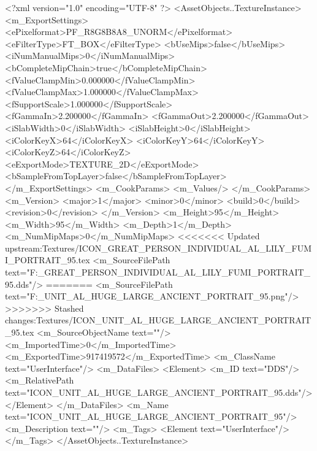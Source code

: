 <?xml version="1.0" encoding="UTF-8" ?>
<AssetObjects..TextureInstance>
	<m_ExportSettings>
		<ePixelformat>PF_R8G8B8A8_UNORM</ePixelformat>
		<eFilterType>FT_BOX</eFilterType>
		<bUseMips>false</bUseMips>
		<iNumManualMips>0</iNumManualMips>
		<bCompleteMipChain>true</bCompleteMipChain>
		<fValueClampMin>0.000000</fValueClampMin>
		<fValueClampMax>1.000000</fValueClampMax>
		<fSupportScale>1.000000</fSupportScale>
		<fGammaIn>2.200000</fGammaIn>
		<fGammaOut>2.200000</fGammaOut>
		<iSlabWidth>0</iSlabWidth>
		<iSlabHeight>0</iSlabHeight>
		<iColorKeyX>64</iColorKeyX>
		<iColorKeyY>64</iColorKeyY>
		<iColorKeyZ>64</iColorKeyZ>
		<eExportMode>TEXTURE_2D</eExportMode>
		<bSampleFromTopLayer>false</bSampleFromTopLayer>
	</m_ExportSettings>
	<m_CookParams>
		<m_Values/>
	</m_CookParams>
	<m_Version>
		<major>1</major>
		<minor>0</minor>
		<build>0</build>
		<revision>0</revision>
	</m_Version>
	<m_Height>95</m_Height>
	<m_Width>95</m_Width>
	<m_Depth>1</m_Depth>
	<m_NumMipMaps>0</m_NumMipMaps>
<<<<<<< Updated upstream:Textures/ICON_GREAT_PERSON_INDIVIDUAL_AL_LILY_FUMI_PORTRAIT_95.tex
	<m_SourceFilePath text="F:\DT\lilyimages\gpportrait\ICON_GREAT_PERSON_INDIVIDUAL_AL_LILY_FUMI_PORTRAIT_95.dds"/>
=======
	<m_SourceFilePath text="F:\DT\lilyimages\all\ICON_UNIT_AL_HUGE_LARGE_ANCIENT_PORTRAIT_95.png"/>
>>>>>>> Stashed changes:Textures/ICON_UNIT_AL_HUGE_LARGE_ANCIENT_PORTRAIT_95.tex
	<m_SourceObjectName text=""/>
	<m_ImportedTime>0</m_ImportedTime>
	<m_ExportedTime>917419572</m_ExportedTime>
	<m_ClassName text="UserInterface"/>
	<m_DataFiles>
		<Element>
			<m_ID text="DDS"/>
			<m_RelativePath text="ICON_UNIT_AL_HUGE_LARGE_ANCIENT_PORTRAIT_95.dds"/>
		</Element>
	</m_DataFiles>
	<m_Name text="ICON_UNIT_AL_HUGE_LARGE_ANCIENT_PORTRAIT_95"/>
	<m_Description text=""/>
	<m_Tags>
		<Element text="UserInterface"/>
	</m_Tags>
</AssetObjects..TextureInstance>

